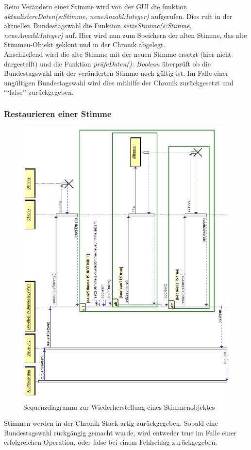 \documentclass[12pt,a4paper,titlepage]{article}
\newcommand{\mymo}{\fontfamily{pcr}\selectfont \textit}
\begin{document}
	Beim Verändern einer Stimme wird von der GUI die funktion {\mymo{aktualisiereDaten(s:Stimme, neueAnzahl:Integer)}} aufgerufen. Dies ruft in der aktuellen Bundestagswahl die Funktion {\mymo{setzeStimme(s:Stimme, neueAnzahl:Integer)}} auf. Hier wird nun zum Speichern der alten Stimme, das alte Stimmen-Objekt geklont und in der Chronik abgelegt. \\
	Anschließend wird die alte Stimme mit der neuen Stimme ersetzt (hier nicht dargestellt) und die Funktion {\mymo{prüfeDaten(): Boolean}} überprüft ob die Bundestagswahl mit der veränderten Stimme noch gültig ist. Im Falle einer ungültigen Bundestagswahl wird dies mithilfe der Chronik zurückgesetzt und ```false'' zurückgegeben.
	\newpage
	\subsubsection{Restaurieren einer Stimme}
	\begin{figure}[!ht]
		\centering
		\includegraphics[scale=0.7]{Sequenzdiagramme/Chronik_Sequenzdiagramm-restaurieren.png} \caption{Sequenzdiagramm zur Wiederherstellung eines Stimmenobjektes}
	\end{figure}
	Stimmen werden in der Chronik Stack-artig zurückgegeben. Sobald eine Bundestagswahl rückgängig gemacht wurde, wird entweder true im Falle einer erfolgreichen Operation, oder false bei einem Fehlschlag zurückgegeben.
\end{document}
